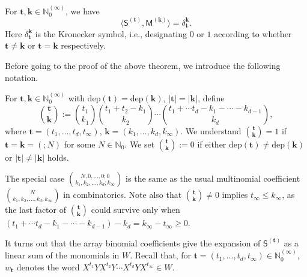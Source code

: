 \documentclass[ALCO,Unicode,published]{cedram}
\def\bk{{\mathbf{k}}}
\def\MM{{\mathsf{M}}}
\def\SS{{\mathsf{S}}}
\def\dep{\mathrm{dep}}
\def\bt{{\mathbf{t}}}
\def\lp{\langle}
\def\rp{\rangle}
\def\N{{\mathbb N}}
\begin{document}
\begin{Theorem}[Duality] \label{orthogonality}
For $\bt, \bk\in \N_0^{(\infty)}$, we have
$$
\lp \SS^{(\bt)},\MM^{(\bk)}\rp=\delta_\bt^{\bk}.
$$
Here $\delta_\bt^{\bk}$ is the Kronecker symbol, i.e., designating $0$ or $1$
according to whether $\bt\ne\bk$ or $\bt=\bk$ respectively.
\end{Theorem}

Before going to the proof of the above theorem, we introduce the following
notation.

\begin{Definition}
For $\bt,\bk\in  \N_0^{(\infty)}$ with $\dep(\bt)=\dep(\bk)$, 
$|\bt|=|\bk|$, define
\begin{equation} \label{ArrayBino}
\binom{\bt}{\bk}:=
\binom{t_1}{k_1}
\binom{t_1+t_2-k_1}{k_2}
\cdots
\binom{t_1+\cdots t_d-k_1-\cdots-k_{d-1}}{k_d},
\end{equation}
where $\bt=(t_1,\dots,t_d,t_\infty)$,
$\bk=(k_1,\dots,k_d,k_\infty)$.
We understand $\binom{\bt}{\bk}=1$ if
$\bt=\bk=(;N)$ for some $N\in \N_0$.
We set $\binom{\bt}{\bk}:=0$ if either $\dep(\bt)\ne\dep(\bk)$ or 
$|\bt|\ne|\bk|$ holds.
\end{Definition}

\begin{Remark} 
\label{rem2.6}
The special case $\binom{N,0,\dots,0;0}{k_1,k_2,\dots,k_d;k_\infty}$ 
is the same as the usual multinomial coefficient 
$\binom{N}{k_1,k_2,\dots,k_d,k_\infty}$ in combinatorics.
Note also that $\binom{\bt}{\bk}\ne 0$ implies $t_\infty\le k_\infty$,
as the last factor of $\binom{\bt}{\bk}$ could survive only when 
$(t_1+\cdots t_d-k_1-\cdots-k_{d-1})-k_d=k_\infty-t_\infty\ge 0$.
\end{Remark}

It turns out that the array binomial coefficients give
the expansion of $\SS^{(\bt)}$ as a linear sum of the monomials in $W$.
Recall that, for $\bt=(t_1,\dots,t_d,t_\infty)\in  \N_0^{(\infty)}$, 
$w_\bt$ denotes the word $X^{t_1}YX^{t_2}Y\cdots X^{t_d}YX^{t_\infty}\in W$.
\end{document}
